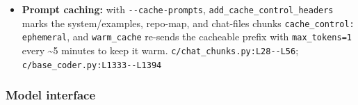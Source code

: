 \begin{itemize}
\item \textbf{Prompt caching:} with \texttt{-\allowbreak{}-\allowbreak{}cache-\allowbreak{}prompts}, \texttt{add\_\allowbreak{}cache\_\allowbreak{}control\_\allowbreak{}headers} marks the system/examples, repo-map, and chat-files chunks \texttt{cache\_\allowbreak{}control:\allowbreak{} ephemeral}, and \texttt{warm\_\allowbreak{}cache} re-sends the cacheable prefix with \texttt{max\_\allowbreak{}tokens=1} every \textasciitilde{}5 minutes to keep it warm. \texttt{c/\allowbreak{}chat\_\allowbreak{}chunks.\allowbreak{}py:\allowbreak{}L28-\allowbreak{}-\allowbreak{}L56}; \texttt{c/\allowbreak{}base\_\allowbreak{}coder.\allowbreak{}py:\allowbreak{}L1333-\allowbreak{}-\allowbreak{}L1394}
\end{itemize}

\subsubsection*{Model interface}
